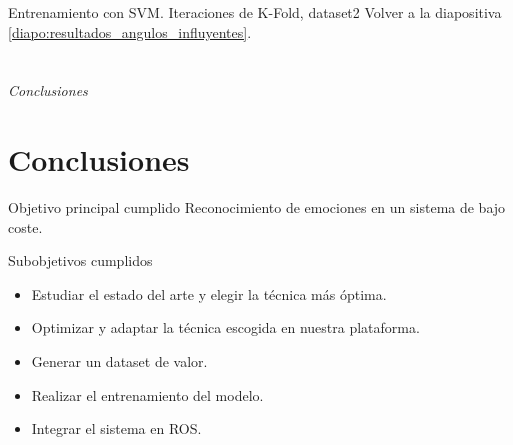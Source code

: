 \documentclass{beamer}
\begin{document}
\begin{frame}{Entrenamiento con SVM. Iteraciones de K-Fold, dataset2}
Volver a la diapositiva \ref{diapo:resultados_angulos_influyentes}.
\end{frame}

\section*{}
\begin{frame}{}
  \centering \Huge
  \emph{Conclusiones}
\end{frame}

\section{Conclusiones}
\begin{frame}
\label{diapo:conclusiones}
\begin{block}{Objetivo principal cumplido}
Reconocimiento de emociones en un sistema de bajo coste.
\end{block}

\begin{block}{Subobjetivos cumplidos}
\begin{itemize}
    \item Estudiar el estado del arte y elegir la técnica más óptima.
    \item Optimizar y adaptar la técnica escogida en nuestra plataforma.
    \item Generar un dataset de valor.
    \item Realizar el entrenamiento del modelo.
    \item Integrar el sistema en ROS.
\end{itemize}
\end{block}

\end{frame}
\end{document}
